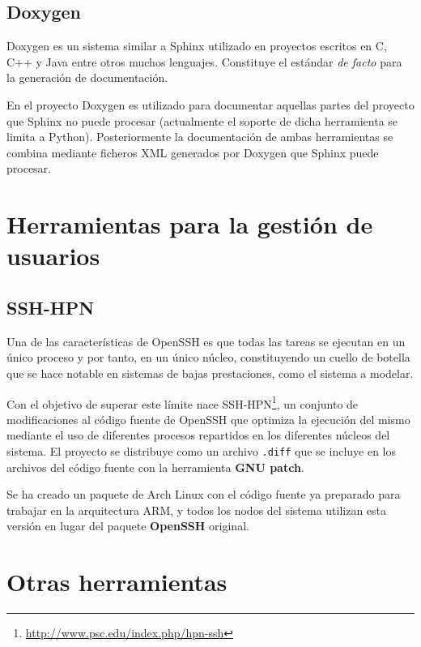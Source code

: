 \subsection{Doxygen}

Doxygen es un sistema similar a Sphinx utilizado en proyectos escritos en C, C++ y Java entre otros muchos lenguajes. Constituye el estándar \textit{de facto} para la generación de documentación.

En el proyecto Doxygen es utilizado para documentar aquellas partes del proyecto que Sphinx no puede procesar (actualmente el soporte de dicha herramienta se limita a Python). Posteriormente la documentación de ambas herramientas se combina mediante ficheros XML generados por Doxygen que Sphinx puede procesar.

\section{Herramientas para la gestión de usuarios}

\subsection{SSH-HPN}

Una de las características de OpenSSH es que todas las tareas se ejecutan en un único proceso y por tanto, en un único núcleo, constituyendo un cuello de botella que se hace notable en sistemas de bajas prestaciones, como el sistema a modelar.

Con el objetivo de superar este límite nace SSH-HPN\footnote{\href{http://www.psc.edu/index.php/hpn-ssh}{http://www.psc.edu/index.php/hpn-ssh}}, un conjunto de modificaciones al código fuente de OpenSSH que optimiza la ejecución del mismo mediante el uso de diferentes procesos repartidos en los diferentes núcleos del sistema. El proyecto se distribuye como un archivo \texttt{.diff} que se incluye en los archivos del código fuente con la herramienta \textbf{GNU patch}.

Se ha creado un paquete de Arch Linux con el código fuente ya preparado para trabajar en la arquitectura ARM, y todos los nodos del sistema utilizan esta versión en lugar del paquete \textbf{OpenSSH} original.

\section{Otras herramientas}

